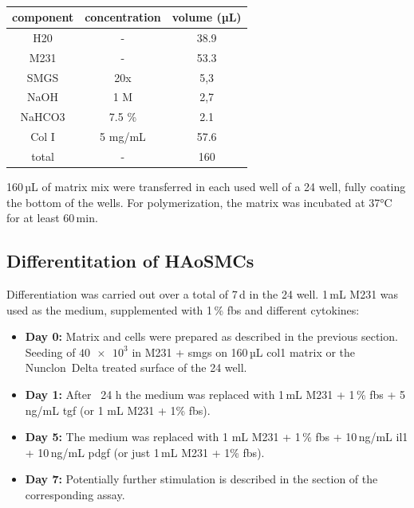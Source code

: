     \begin{table}[h]
    \capstart
	\centering
	\begin{minipage}{\captionwidth}
	   	\caption[Col I matrix]{}
	   	\label{tab:qPCR_samples}
	\end{minipage}
    \begin{tabular}{|c|c|c|}
        \hline
        component & concentration & volume (µL) \\ \hline
        H20       & -             & 38.9        \\
        M231      & -             & 53.3        \\
        SMGS      & 20x           & 5,3         \\
        NaOH      & 1 M           & 2,7         \\
        NaHCO3    & 7.5 \%        & 2.1         \\
        Col I     & 5 mg/mL       & 57.6        \\ \hline
        total     & -             & 160         \\ \hline
    \end{tabular}
    \end{table}

    160\,µL of matrix mix were transferred in each used well of a \ac{24 well}, fully coating the bottom of the wells. For polymerization, the matrix was incubated at 37°C for at least 60\,min.

    \subsection{Differentitation of HAoSMCs}
    \label{subsec:differentiation}
    Differentiation was carried out over a total of 7\,d in the \ac{24 well}. 1\,mL M231 was used as the medium, supplemented with 1\,\% \ac{fbs} and different cytokines:
    \begin{itemize}
        \item \textbf{Day 0:} Matrix and cells were prepared as described in the previous section. Seeding of $\num{40e3}$ in M231 + \ac{smgs} on 160\,µL \ac{col1} matrix or the Nunclon\texttrademark~Delta treated surface of the \ac{24 well}.
        \item \textbf{Day 1:} After ~24 h the medium was replaced with 1\,mL M231 + 1\,\% \ac{fbs} + 5\,ng/mL \ac{tgf} (or 1 mL M231 + 1\% \ac{fbs}).
        \item \textbf{Day 5:} The medium was replaced with 1 mL M231 + 1\,\% \ac{fbs} + 10\,ng/mL \ac{il1} + 10\,ng/mL \ac{pdgf} (or just 1\,mL M231 + 1\% \ac{fbs}).
        \item \textbf{Day 7:} Potentially further stimulation is described in the section of the corresponding assay.
    \end{itemize}

